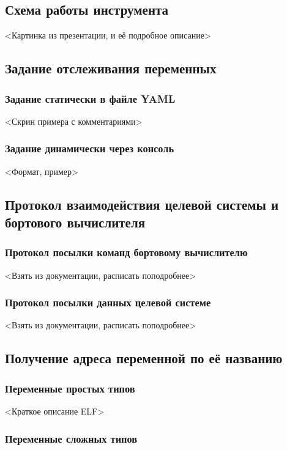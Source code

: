 \documentclass[oneside,senior,etd]{BYUPhys}
\begin{document}
\subsection{Схема работы инструмента}
<Картинка из презентации, и её подробное описание>

\subsection{Задание отслеживания переменных}

\subsubsection{Задание статически в файле YAML}
<Скрин примера с комментариями>

\subsubsection{Задание динамически через консоль}
<Формат, пример>

\subsection{Протокол взаимодействия целевой системы и бортового вычислителя}

\subsubsection{Протокол посылки команд бортовому вычислителю}
<Взять из документации, расписать поподробнее>

\subsubsection{Протокол посылки данных целевой системе}
<Взять из документации, расписать поподробнее>

\subsection{Получение адреса переменной по её названию}

\subsubsection{Переменные простых типов}

<Краткое описание ELF>

\subsubsection{Переменные сложных типов}
\end{document}
